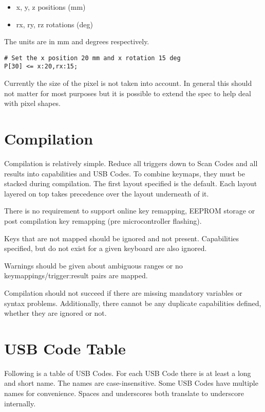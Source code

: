 \documentclass{kiibohd-template}
\begin{document}
\begin{itemize}
\item x, y, z positions (mm)
\item rx, ry, rz rotations (deg)
\end{itemize}

The units are in mm and degrees respectively.

\begin{lstlisting}
# Set the x position 20 mm and x rotation 15 deg
P[30] <= x:20,rx:15;
\end{lstlisting}

Currently the size of the pixel is not taken into account.
In general this should not matter for most purposes but it is possible to extend the spec to help deal with pixel shapes.


\chapter{Compilation}

Compilation is relatively simple.
Reduce all triggers down to Scan Codes and all results into capabilities and USB Codes.
To combine keymaps, they must be stacked during compilation.
The first layout specified is the default.
Each layout layered on top takes precedence over the layout underneath of it.

There is no requirement to support online key remapping, EEPROM storage or post compilation key remapping (pre microcontroller flashing).

Keys that are not mapped should be ignored and not present.
Capabilities specified, but do not exist for a given keyboard are also ignored.

Warnings should be given about ambiguous ranges or no keymappings/trigger:result pairs are mapped.

Compilation should not succeed if there are missing mandatory variables or syntax problems.
Additionally, there cannot be any duplicate capabilities defined, whether they are ignored or not.


\newpage
\chapter{USB Code Table}
\label{chpt:USBCodeTable}

Following is a table of USB Codes.
For each USB Code there is at least a long and short name.
The names are case-insensitive.
Some USB Codes have multiple names for convenience.
Spaces and underscores both translate to underscore internally.
\end{document}
